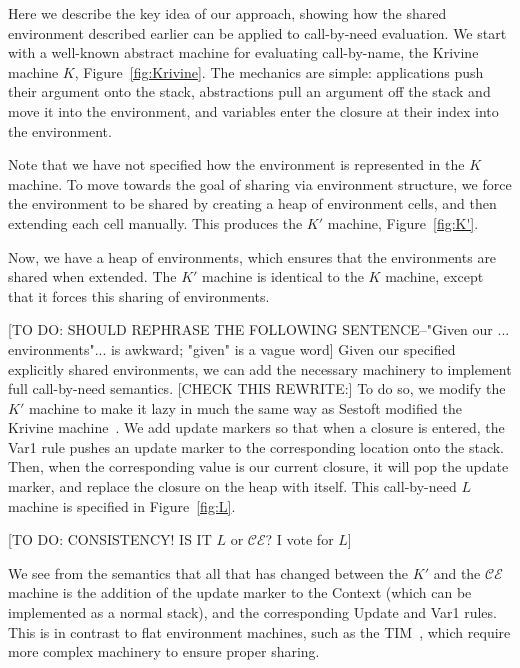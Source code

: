 \documentclass[preprint]{sigplanconf}
\begin{document}
Here we describe the key idea of our approach, showing how
the shared environment described earlier can be applied to call-by-need
evaluation. We start with a well-known abstract machine for evaluating
call-by-name, the Krivine machine $K$, Figure~\ref{fig:Krivine}.
The mechanics are simple: applications push their argument onto the stack,
abstractions pull an argument off the stack and move it into the environment,
and variables enter the closure at their index into the environment.



Note that we have not specified how the environment is represented in the $K$
machine. To move towards the goal of sharing via environment structure,
we force the environment to be shared by creating a heap of environment
cells, and then extending each cell manually. This produces the $K'$ machine,
Figure~\ref{fig:K'}.



Now, we have a heap of environments, which ensures that the
environments are shared when extended.  The $K'$ machine is identical to the $K$
machine, except that it forces this sharing of environments. 

[TO DO: SHOULD REPHRASE THE FOLLOWING SENTENCE--"Given our ... environments"... is awkward; "given" is a vague word]
Given our specified explicitly shared environments, we can add the necessary
machinery to implement full call-by-need semantics.
[CHECK THIS REWRITE:] To do so, we modify the $K'$ machine to make it lazy
in much the same way as Sestoft modified the Krivine machine~\cite{sestoft}.
We add update markers so that when a closure is entered, the
Var1 rule pushes an update marker to the corresponding location onto the stack.
Then, when the corresponding value is our current closure, it will pop the
update marker, and replace the closure on the heap with itself. This
call-by-need $L$ machine is specified in Figure~\ref{fig:L}.



[TO DO: CONSISTENCY! IS IT $L$ or $\mathcal{CE}$? I vote for $L$]

We see from the semantics that all that has changed between the $K'$ and the
$\mathcal{CE}$ machine is the addition of the update marker to the Context
(which can be implemented as a normal stack), and the corresponding Update and
Var1 rules. This is in contrast to flat environment machines, such as the TIM~\cite{TIM}, which require more
complex machinery to ensure proper sharing.
\end{document}
